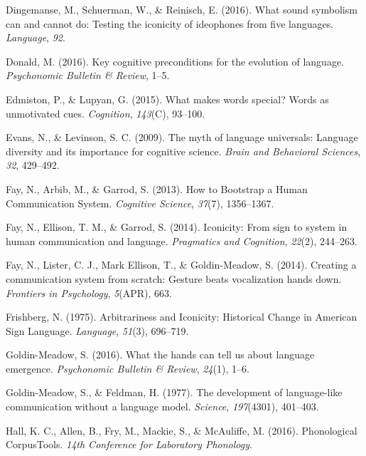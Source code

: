 \documentclass[english,floatsintext,man]{apa6}
\theoremstyle{definition}
\theoremstyle{definition}
\theoremstyle{definition}
\theoremstyle{remark}
\begin{document}
\leavevmode\hypertarget{ref-Dingemanse:2016vd}{}%
Dingemanse, M., Schuerman, W., \& Reinisch, E. (2016). What sound
symbolism can and cannot do: Testing the iconicity of ideophones from
five languages. \emph{Language}, \emph{92}.

\leavevmode\hypertarget{ref-Donald:2016kd}{}%
Donald, M. (2016). Key cognitive preconditions for the evolution of
language. \emph{Psychonomic Bulletin \& Review}, 1--5.

\leavevmode\hypertarget{ref-Edmiston:2015he}{}%
Edmiston, P., \& Lupyan, G. (2015). What makes words special? Words as
unmotivated cues. \emph{Cognition}, \emph{143}(C), 93--100.

\leavevmode\hypertarget{ref-Evans:2009dk}{}%
Evans, N., \& Levinson, S. C. (2009). The myth of language universals:
Language diversity and its importance for cognitive science. \emph{Brain
and Behavioral Sciences}, \emph{32}, 429--492.

\leavevmode\hypertarget{ref-Fay:2013jpa}{}%
Fay, N., Arbib, M., \& Garrod, S. (2013). How to Bootstrap a Human
Communication System. \emph{Cognitive Science}, \emph{37}(7),
1356--1367.

\leavevmode\hypertarget{ref-Fay:2014ih}{}%
Fay, N., Ellison, T. M., \& Garrod, S. (2014). Iconicity: From sign to
system in human communication and language. \emph{Pragmatics and
Cognition}, \emph{22}(2), 244--263.

\leavevmode\hypertarget{ref-Fay:2014cw}{}%
Fay, N., Lister, C. J., Mark Ellison, T., \& Goldin-Meadow, S. (2014).
Creating a communication system from scratch: Gesture beats vocalization
hands down. \emph{Frontiers in Psychology}, \emph{5}(APR), 663.

\leavevmode\hypertarget{ref-Frishberg:1975dh}{}%
Frishberg, N. (1975). Arbitrariness and Iconicity: Historical Change in
American Sign Language. \emph{Language}, \emph{51}(3), 696--719.

\leavevmode\hypertarget{ref-GoldinMeadow:2016bw}{}%
Goldin-Meadow, S. (2016). What the hands can tell us about language
emergence. \emph{Psychonomic Bulletin \& Review}, \emph{24}(1), 1--6.

\leavevmode\hypertarget{ref-GoldinMeadow:1977gz}{}%
Goldin-Meadow, S., \& Feldman, H. (1977). The development of
language-like communication without a language model. \emph{Science},
\emph{197}(4301), 401--403.

\leavevmode\hypertarget{ref-PCT:1.1}{}%
Hall, K. C., Allen, B., Fry, M., Mackie, S., \& McAuliffe, M. (2016).
Phonological CorpusTools. \emph{14th Conference for Laboratory
Phonology}.
\end{document}
